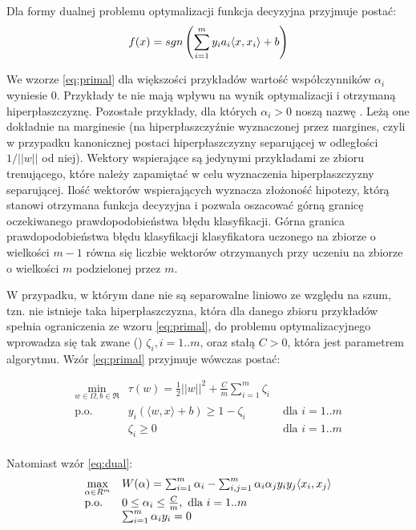 Dla formy dualnej problemu optymalizacji funkcja decyzyjna przyjmuje postać:
\begin{equation}
f(x) = sgn \left( \sum_{i=1}^{m} y_i a_i \langle x, x_i \rangle + b \right)
\end{equation}

We wzorze \ref{eq:primal} dla większości przykładów wartość współczynników $ \alpha_i $ wyniesie 0. Przykłady te nie mają wpływu na wynik optymalizacji i otrzymaną hiperpłaszczyznę. Pozostałe przykłady, dla których $ \alpha_i > 0 $ noszą nazwę . Leżą one dokładnie na marginesie (na hiperpłaszczyźnie wyznaczonej przez margines, czyli w przypadku kanonicznej postaci hiperpłaszczyzny separującej w odległości $ 1/||w|| $ od niej). Wektory wspierające są jedynymi przykładami ze zbioru trenującego, które należy zapamiętać w celu wyznaczenia hiperpłaszczyzny separującej. Ilość wektorów wspierających wyznacza złożoność hipotezy, którą stanowi otrzymana funkcja decyzyjna i pozwala oszacować górną granicę oczekiwanego prawdopodobieństwa błędu klasyfikacji. Górna granica prawdopodobieństwa błędu klasyfikacji klasyfikatora uczonego na zbiorze o wielkości $ m-1 $ równa się liczbie wektorów otrzymanych przy uczeniu na zbiorze o wielkości $ m $ podzielonej przez $ m $.


W przypadku, w którym dane nie są separowalne liniowo ze względu na szum, tzn. nie istnieje taka hiperpłaszczyzna, która dla danego zbioru przykładów spełnia ograniczenia ze wzoru \ref{eq:primal}, do problemu optymalizacyjnego wprowadza się tak zwane  () $ \zeta_i, i=1..m $, oraz stałą $ C > 0 $, która jest parametrem algorytmu.
Wzór \ref{eq:primal} przyjmuje wówczas postać: 

\begin{equation}
\begin{array}{lll}
\min\limits_{w \in \Omega, b \in \Re} &  \tau(w) = \frac{1}{2}||w||^2 + \frac{C}{m} \sum_{i=1}^{m} \zeta_i & \\
\text{p.o.} &  y_i  (\langle w, x \rangle + b) \geq 1 - \zeta_i & \text{ dla } i=1..m \\
& \zeta_i \geq 0 & \text{ dla } i=1..m \\
\end{array}
\label{eq:primal-c}
\end{equation}

Natomiast wzór \ref{eq:dual}:
\begin{equation}
\begin{array}{ll}
\max\limits_{\alpha \in R^m} & W(\alpha) = \sum_{i=1}^{m} \alpha_i - \sum_{i,j=1}^{m} \alpha_i \alpha_j y_i y_j \langle x_i, x_j \rangle \\
\text{p.o.} & 0 \leq \alpha_i \leq \frac{C}{m} , \text{ dla } i=1..m \\
& \sum_{i=1}^{m} \alpha_i y_i = 0
\end{array}
\label{eq:dual-c}
\end{equation}

